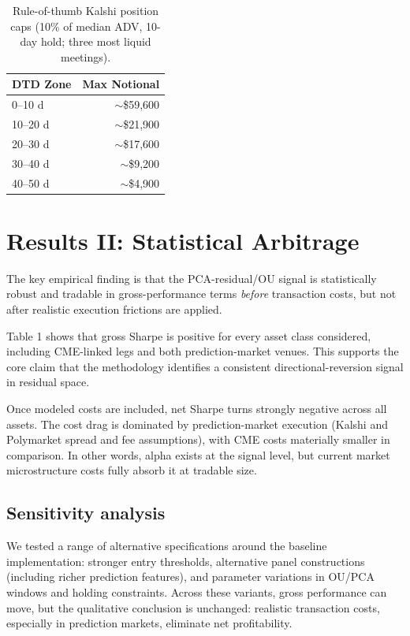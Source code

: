 \begin{table}[h]
    \centering
    \caption{Rule-of-thumb Kalshi position caps (10\% of median ADV,
             10-day hold; three most liquid meetings).}
    \label{tab:kalshi-caps}
    \begin{tabular}{lr}
        \toprule
        \textbf{DTD Zone} & \textbf{Max Notional} \\
        \midrule
         0--10 d & $\sim$\$59,600 \\
        10--20 d & $\sim$\$21,900 \\
        20--30 d & $\sim$\$17,600 \\
        30--40 d & $\sim$\$9,200  \\
        40--50 d & $\sim$\$4,900  \\
        \bottomrule
    \end{tabular}
\end{table}


\section{Results II: Statistical Arbitrage}

The key empirical finding is that the PCA-residual/OU signal is statistically robust and tradable in gross-performance terms \emph{before} transaction costs, but not after realistic execution frictions are applied.

Table 1 shows that gross Sharpe is positive for every asset class considered, including CME-linked legs and both prediction-market venues. This supports the core claim that the methodology identifies a consistent directional-reversion signal in residual space. 

Once modeled costs are included, net Sharpe turns strongly negative across all assets. The cost drag is dominated by prediction-market execution (Kalshi and Polymarket spread and fee assumptions), with CME costs materially smaller in comparison. In other words, alpha exists at the signal level, but current market microstructure costs fully absorb it at tradable size.

\subsection{Sensitivity analysis}

We tested a range of alternative specifications around the baseline implementation: stronger entry thresholds, alternative panel constructions (including richer prediction features), and parameter variations in OU/PCA windows and holding constraints. Across these variants, gross performance can move, but the qualitative conclusion is unchanged: realistic transaction costs, especially in prediction markets, eliminate net profitability.

